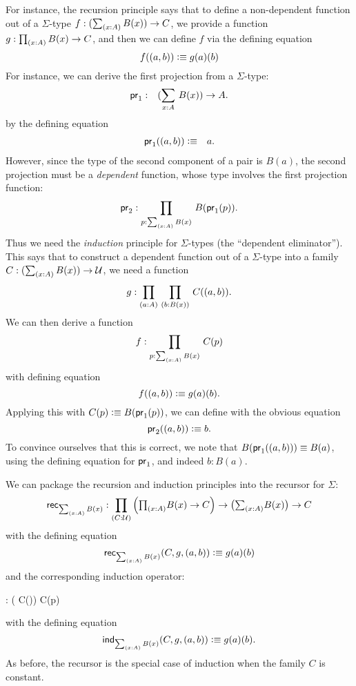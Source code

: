 For instance, the recursion principle%
says that to define a non-dependent function out of a $\Sigma$-type
$f : (\sm{x:A} B(x)) \to C$, we provide a function 
$g : \prd{x:A} B(x) \to C$, and then we can define $f$ via the defining
equation
\[ f((a,b)) \vcentcolon\equiv g(a)(b) \]
%
For instance, we can derive the first projection from a $\Sigma$-type:
\begin{eqnarray*}
  \fst & : & (\sm{x : A}B(x)) \to A.
\end{eqnarray*}
by the defining equation
\begin{eqnarray*}
  \mathsf{pr}_{1}((a,b)) & \vcentcolon\equiv & a.
\end{eqnarray*}
However, since the type of the second component of a pair
is $B(a)$, the second projection must be a \emph{dependent} function, whose type involves the first projection function:
\[ \snd : \prd{p:\sm{x : A}B(x)}B(\fst(p)). \]
Thus we need the \emph{induction} principle%
for $\Sigma$-types (the ``dependent eliminator'').
This says that to construct a dependent function out of a $\Sigma$-type into a family $C : (\sm{x:A} B(x)) \to \UU$, we need a function
\[ g : \prd{a:A}{b:B(x)} C(\tup{a}{b}). \]
We can then derive a function 
\[ f : \prd{p : \sm{x:A}B(x)} C(p) \]
with  defining equation
\[ f((a,b)) \vcentcolon\equiv g(a)(b).\]
Applying this with $C(p)\vcentcolon\equiv B(\mathsf{pr}_{1}(p))$, we can define
with the obvious equation
\[ \mathsf{pr}_{2}((a,b))  \vcentcolon\equiv  b. \]
To convince ourselves that this is correct, we note that $B (\mathsf{pr}_{1}((a,b))) \equiv B(a)$, using the defining equation for $\mathsf{pr}_{1}$, and
indeed $b : B(a)$.

We can package the recursion and induction principles into the recursor for $\Sigma$:
\[ \rec{\sm{x:A}B(x)} : \dprd{C:\UU}\Parens{\tprd{x:A} B(x) \to C} \to
\big(\tsm{x:A}B(x)\big) \to C \]
with the defining equation
\[ \rec{\sm{x:A}B(x)}(C,g,\tup{a}{b}) \defeq g(a)(b) \]
and the corresponding induction operator:
\begin{narrowmultline*}
   : \narrowbreak
    \Big( C()\Big)
    \to {} C(p)
\end{narrowmultline*}
with the defining equation 
\[ \ind{\sm{x:A}B(x)}(C,g,\tup{a}{b}) \defeq g(a)(b). \]
As before, the recursor is the special case of induction
when the family $C$ is constant.

